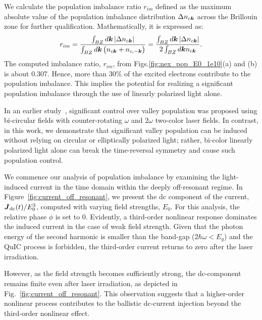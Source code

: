 We calculate the population imbalance ratio $r_{im}$ defined as the maximum absolute value of the
population imbalance distribution $\Delta n_{c\boldsymbol{k}}$ across the Brillouin zone for further
qualification. Mathematically, it is expressed as:
\begin{equation}
r_{im} = \frac{\int_{BZ}d\boldsymbol k \left |\Delta n_{c\boldsymbol{k}} \right |}{\int_{BZ}d\boldsymbol k \left (n_{c\boldsymbol{k}} + n_{c,-\boldsymbol{k}}\right )}
= \frac{\int_{BZ}d\boldsymbol k \left |\Delta n_{c\boldsymbol{k}} \right |}{2\int_{BZ}d\boldsymbol k n_{c\boldsymbol{k}}}.
\end{equation}
The computed imbalance ratio, $r_{im}$, from Figs.\ref{fig:nex_pop_E0_1e10}(a) and (b) is about
0.307. Hence, more than 30\% of the excited electrons contribute to the population imbalance.
This implies the potential for realizing a significant population imbalance through the use of linearly polarized light alone.

In an earlier study~\cite{Jimenez-Galan2020}, significant control over valley population was proposed using bi-circular fields with counter-rotating $\omega$ and $2\omega$ two-color laser fields. In contrast, in this work, we demonstrate that significant valley population can be induced without relying on circular or elliptically polarized light; rather, bi-color linearly polarized light alone can break the time-reversal symmetry and cause such population control.


We commence our analysis of population imbalance by examining the light-induced current in the time domain within the deeply off-resonant regime. In Figure~\ref{fig:current_off_resonant}, we present the dc component of the current, $\boldsymbol{J}_{\text{dc}}(t)/E_0^3$, computed with varying field strengths, $E_0$. For this analysis, the relative phase $\phi$ is set to 0. Evidently, a third-order nonlinear response dominates the induced current in the case of weak field strength. Given that the photon energy of the second harmonic is smaller than the band-gap ($2\hbar \omega < E_g$) and the \gls{QuIC} process is forbidden, the third-order current returns to zero after the laser irradiation.

However, as the field strength becomes sufficiently strong, the dc-component remains finite even after laser irradiation, as depicted in Fig.~\ref{fig:current_off_resonant}. This observation suggests that a higher-order nonlinear process contributes to the ballistic dc-current injection beyond the third-order nonlinear effect.

